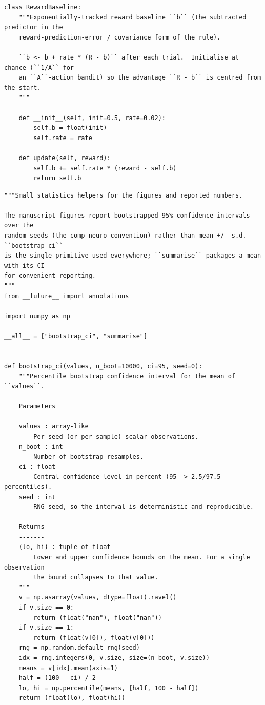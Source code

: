 \begin{lstlisting}[caption={mrl\_trace/learning.py},label={lst:siox-src-learning}]
class RewardBaseline:
    """Exponentially-tracked reward baseline ``b`` (the subtracted predictor in the
    reward-prediction-error / covariance form of the rule).

    ``b <- b + rate * (R - b)`` after each trial.  Initialise at chance (``1/A`` for
    an ``A``-action bandit) so the advantage ``R - b`` is centred from the start.
    """

    def __init__(self, init=0.5, rate=0.02):
        self.b = float(init)
        self.rate = rate

    def update(self, reward):
        self.b += self.rate * (reward - self.b)
        return self.b
\end{lstlisting}

\begin{lstlisting}[caption={mrl\_trace/stats.py},label={lst:siox-src-stats}]
"""Small statistics helpers for the figures and reported numbers.

The manuscript figures report bootstrapped 95% confidence intervals over the
random seeds (the comp-neuro convention) rather than mean +/- s.d. ``bootstrap_ci``
is the single primitive used everywhere; ``summarise`` packages a mean with its CI
for convenient reporting.
"""
from __future__ import annotations

import numpy as np

__all__ = ["bootstrap_ci", "summarise"]


def bootstrap_ci(values, n_boot=10000, ci=95, seed=0):
    """Percentile bootstrap confidence interval for the mean of ``values``.

    Parameters
    ----------
    values : array-like
        Per-seed (or per-sample) scalar observations.
    n_boot : int
        Number of bootstrap resamples.
    ci : float
        Central confidence level in percent (95 -> 2.5/97.5 percentiles).
    seed : int
        RNG seed, so the interval is deterministic and reproducible.

    Returns
    -------
    (lo, hi) : tuple of float
        Lower and upper confidence bounds on the mean. For a single observation
        the bound collapses to that value.
    """
    v = np.asarray(values, dtype=float).ravel()
    if v.size == 0:
        return (float("nan"), float("nan"))
    if v.size == 1:
        return (float(v[0]), float(v[0]))
    rng = np.random.default_rng(seed)
    idx = rng.integers(0, v.size, size=(n_boot, v.size))
    means = v[idx].mean(axis=1)
    half = (100 - ci) / 2
    lo, hi = np.percentile(means, [half, 100 - half])
    return (float(lo), float(hi))



\end{lstlisting}
